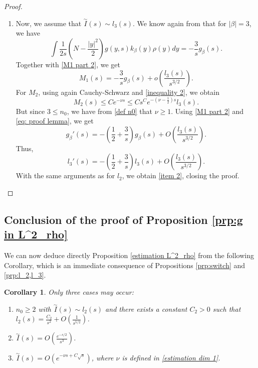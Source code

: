 \documentclass[11pt,a4paper]{article}
\newcommand{\1}{\mathbbm{1}}
\numberwithin{equation}{section}
\newtheorem{cor}[lemma]{Corollary}
\theoremstyle{remark}
\begin{document}
\begin{proof}
\begin{enumerate}[label=(\roman*)]
\item Now, we assume that $\overset{\sim}{I}(s)\sim l_3(s)$. We know again from \cite[p.1200]{KZ2000} that for $|\beta|=3$, we have
$$\int \frac{1}{2s}\left(N-\frac{|y|^2}{2}\right)g(y,s)k_\beta(y)\rho(y)dy= -\frac{3}{s}g_\beta(s).$$
Together with \eqref{M1 part 2}, we get
$$M_1(s)=-\frac{3}{s}g_\beta(s)+o\left(\frac{l_3(s)}{s^{3/2}}\right).$$
For $M_2$, using again Cauchy-Schwarz and \eqref{inequality 2}, we obtain 
\begin{equation}
M_2(s)\leq Ce^{-\nu s}\leq Cs^C e^{-(\nu-\frac{1}{2}) s} l_3(s).
\end{equation}
But since $3\leq n_0$, we have from \ref{def n0} that $\nu \geq 1$. Using \eqref{M1 part 2} and \eqref{eq: proof lemma}, we get
$$g_\beta'(s)=-\left(\frac{1}{2}+\frac{3}{s}\right)g_\beta(s)+O\left(\frac{l_3(s)}{s^{3/2}}\right).$$
Thus, 
$$l_3'(s)=-\left(\frac{1}{2}+\frac{3}{s}\right)l_3(s)+O\left(\frac{l_3(s)}{s^{3/2}}\right).$$
With the same arguments as for $l_2$, we obtain \ref{item 2}, closing the proof.
\end{enumerate}
\end{proof}

\subsection{Conclusion of the proof of Proposition \ref{prp:g in L^2_rho}}
We can now deduce directly Proposition \ref{estimation L^2_rho} from the following Corollary, which is an immediate consequence of Propositions \ref{prp:switch} and \ref{prp:l_2,l_3}.
\begin{cor}\label{corollary: switch dom comp}
Only three cases may occur:
\begin{enumerate}[label=(\roman*)]
\item $n_0\geq 2$ with $\overset{\sim}{I}(s)\sim l_2(s)$ and there exists a constant $C_2>0$ such that $l_2(s)=\frac{C_2}{s^2}+O\left(\frac{1}{s^{5/2}}\right)$.\label{item 1 conclusion}
\item $\overset{\sim}{I}(s)=O\left(\frac{e^{-s/2}}{s^3}\right)$.\label{item 2 conclusion}
\item $\overset{\sim}{I}(s)=O(e^{-\nu s+C\sqrt{s}})$, where $\nu$ is defined in \eqref{estimation dim 1}.\label{item 3 conclusion}
\end{enumerate}
\end{cor}
\end{document}
